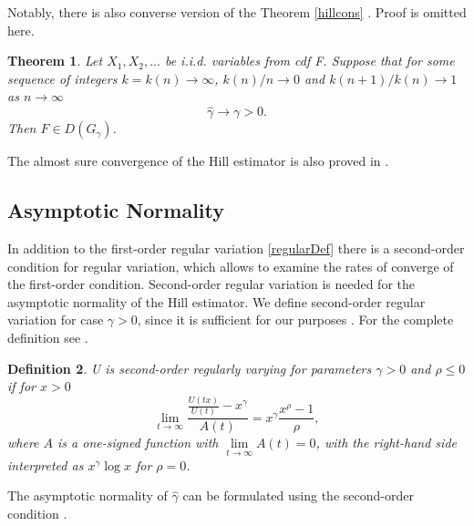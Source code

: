 \documentclass[english,12pt,a4paper,pdftex,sci,utf8]{aaltothesis} %
\newtheorem{theorem}{Theorem}[section]
\newtheorem{definition}[theorem]{Definition}
\begin{document}
Notably, there is also converse version of the Theorem \ref{hillcons} \cite{mason}. Proof is omitted here.

\begin{theorem}
Let $X_1, X_2,...$ be i.i.d. variables from cdf F. Suppose that for some sequence of integers $k=k(n) \rightarrow \infty$, $k(n)/n \rightarrow 0$ and $k(n+1)/k(n) \rightarrow 1$ as $n \rightarrow \infty$
\begin{equation*}
\hat{\gamma} \rightarrow \gamma > 0.
\end{equation*}
Then $F \in D(G_{\gamma})$.
\end{theorem}

The almost sure convergence of the Hill estimator is also proved in \cite{mason}.

\subsection{Asymptotic Normality}


In addition to the first-order regular variation \ref{regularDef} there is a second-order condition for regular variation, which allows to examine the rates of converge of the first-order condition. Second-order regular variation is needed for the asymptotic normality of the Hill estimator. We define second-order regular variation for case $\gamma > 0$, since it is sufficient for our purposes \cite{deHaan}. For the complete definition see \cite{geluk}.

\begin{definition}
U is second-order regularly varying for parameters $\gamma>0$ and $\rho \leq 0$ if for $x>0$
\begin{equation*}
\lim_{t \rightarrow \infty} \frac{\frac{U(tx)}{U(t)}-x^{\gamma}}{A(t)} = x^{\gamma} \frac{x^{\rho}-1}{\rho},
\end{equation*}
where $A$ is a one-signed function with $\lim\limits_{t \rightarrow \infty} A(t)=0$, with the right-hand side interpreted as $x^\gamma \log x$ for $\rho = 0$.
\label{2RV}
\end{definition}


The asymptotic normality of $\hat{\gamma}$ can be formulated using the second-order condition \cite{peng}.
\end{document}
